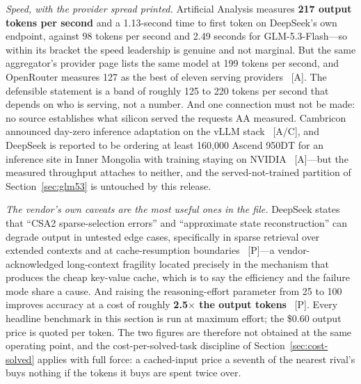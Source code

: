 \emph{Speed, with the provider spread printed.} Artificial Analysis measures \textbf{217 output tokens per second} and a 1.13-second time to first token on DeepSeek's own endpoint, against 98 tokens per second and 2.49 seconds for GLM-5.3-Flash---so within its bracket the speed leadership is genuine and not marginal. But the same aggregator's provider page lists the same model at 199 tokens per second, and OpenRouter measures 127 as the best of eleven serving providers~\cite{aa-v41flash,openrouter-v41flash} [A]. The defensible statement is a band of roughly 125 to 220 tokens per second that depends on who is serving, not a number. And one connection must not be made: no source establishes what silicon served the requests AA measured. Cambricon announced day-zero inference adaptation on the vLLM stack~\cite{deepseek-v41flash-cambricon} [A/C], and DeepSeek is reported to be ordering at least 160,000 Ascend 950DT for an inference site in Inner Mongolia with training staying on NVIDIA~\cite{deepseek-ascend-order} [A]---but the measured throughput attaches to neither, and the served-not-trained partition of Section~\ref{sec:glm53} is untouched by this release.

\emph{The vendor's own caveats are the most useful ones in the file.} DeepSeek states that ``CSA2 sparse-selection errors'' and ``approximate state reconstruction'' can degrade output in untested edge cases, specifically in sparse retrieval over extended contexts and at cache-resumption boundaries~\cite{deepseek-v41flash-vb} [P]---a vendor-acknowledged long-context fragility located precisely in the mechanism that produces the cheap key-value cache, which is to say the efficiency and the failure mode share a cause. And raising the reasoning-effort parameter from 25 to 100 improves accuracy at a cost of roughly \textbf{2.5$\times$ the output tokens}~\cite{deepseek-v41flash-vb} [P]. Every headline benchmark in this section is run at maximum effort; the \$0.60 output price is quoted per token. The two figures are therefore not obtained at the same operating point, and the cost-per-solved-task discipline of Section~\ref{sec:cost-solved} applies with full force: a cached-input price a seventh of the nearest rival's buys nothing if the tokens it buys are spent twice over.

